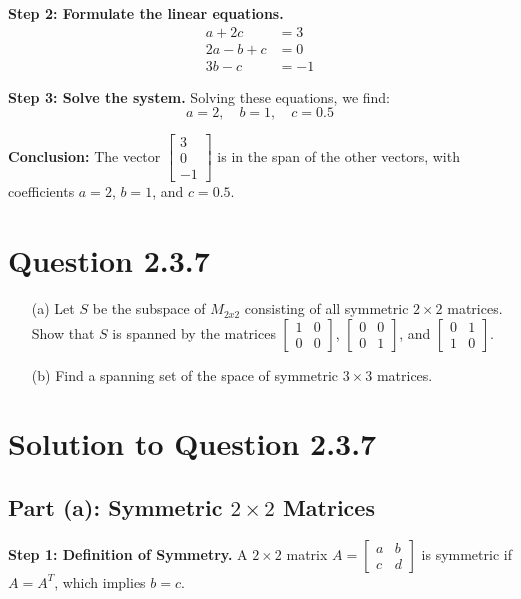 \documentclass[12pt]{article}
\begin{document}
\textbf{Step 2: Formulate the linear equations.}
\[
\begin{aligned}
a + 2c &= 3 \\
2a - b + c &= 0 \\
3b - c &= -1
\end{aligned}
\]

\textbf{Step 3: Solve the system.} Solving these equations, we find:
\[
a = 2, \quad b = 1, \quad c = 0.5
\]

\textbf{Conclusion:} The vector \(\begin{bmatrix} 3 \\ 0 \\ -1 \end{bmatrix}\) is in the span of the other vectors, with coefficients \(a = 2\), \(b = 1\), and \(c = 0.5\).

\newpage
\section*{Question 2.3.7}
\begin{itemize}
    \item[(a)] Let \(S\) be the subspace of \(M_{2x2}\) consisting of all symmetric \(2 \times 2\) matrices. Show that \(S\) is spanned by the matrices \(\begin{bmatrix} 1 & 0 \\ 0 & 0 \end{bmatrix}\), \(\begin{bmatrix} 0 & 0 \\ 0 & 1 \end{bmatrix}\), and \(\begin{bmatrix} 0 & 1 \\ 1 & 0 \end{bmatrix}\).
    \item[(b)] Find a spanning set of the space of symmetric \(3 \times 3\) matrices.
\end{itemize}

\section*{Solution to Question 2.3.7}

\subsection*{Part (a): Symmetric \(2 \times 2\) Matrices}
\textbf{Step 1: Definition of Symmetry.} A \(2 \times 2\) matrix \(A = \begin{bmatrix} a & b \\ c & d \end{bmatrix}\) is symmetric if \(A = A^T\), which implies \(b = c\).
\end{document}
